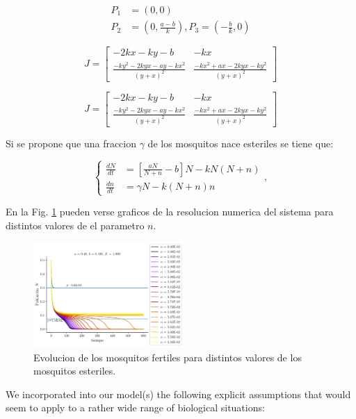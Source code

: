 \documentclass[twocolumn,aps,prl]{revtex4-1}
\begin{document}
$$
\begin{aligned}
    P_1 &= (0, 0) \\ 
    P_2 &= (0, \frac{a-b}{k}), P_3 = (- \frac{b}{k}, 0)
\end{aligned}
$$

$$
J = 
\begin{bmatrix}
    -2kx-ky-b & -kx \\
    \frac{-ky^2-2kyx-ay-kx^2}{\left(y+x\right)^2} & \frac{-kx^2+ax-2kyx-ky^2}{\left(y+x\right)^2}
\end{bmatrix}
$$

$$
J = 
\begin{bmatrix}
    -2kx-ky-b & -kx \\
    \frac{-ky^2-2kyx-ay-kx^2}{\left(y+x\right)^2} & \frac{-kx^2+ax-2kyx-ky^2}{\left(y+x\right)^2}
\end{bmatrix}
$$


Si se propone que una fraccion $\gamma$ de los mosquitos nace esteriles se tiene que:

\begin{equation}
    \left\lbrace
    \begin{aligned}
        \frac{d N}{d t}&=\left[\frac{a N}{N+n}-b\right] N- k N(N+n) \\
        \frac{d n}{d t}&=  \gamma N - k (N+n) n
    \end{aligned}
    \right. ,
\end{equation}


En la Fig. \ref{fig:mosquitos} pueden verse graficos de la resolucion numerica del sistema para distintos valores de el parametro $n$.

\begin{figure}
    \centering
    \includegraphics[width=0.51\textwidth]{figuras/ex02.pdf}
    \caption{Evolucion de los mosquitos fertiles para distintos valores de los mosquitos esteriles.}
    \label{fig:mosquitos}
\end{figure}

We incorporated into our model(s) the following explicit assumptions that would seem to apply to a rather wide range of biological situations: 
\end{document}
